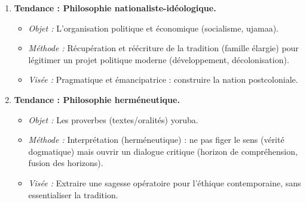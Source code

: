 \documentclass[11pt]{article}
\newcommand{\cle}[1]{{\popxbold\color{popdark}#1}}
\begin{document}
\begin{exoresolu}
\begin{enumerate}
\begin{itemize}
            \item \textit{Méthode :} Argumentation logique, distinction conceptuelle rigoureuse (pensée vs philosophie), réfutation de l'ethnophilosophie (Tempels).
            \item \textit{Visée :} Épistémologique : fonder une philosophie africaine \cle{scientifique} et \cle{universelle} selon les standards académiques.
        \end{itemize}
    \item \textbf{Tendance : Philosophie nationaliste-idéologique.}
        \begin{itemize}
            \item \textit{Objet :} L'organisation politique et économique (socialisme, ujamaa).
            \item \textit{Méthode :} Récupération et réécriture de la tradition (famille élargie) pour légitimer un projet politique moderne (développement, décolonisation).
            \item \textit{Visée :} \cle{Pragmatique} et \cle{émancipatrice} : construire la nation postcoloniale.
        \end{itemize}
    \item \textbf{Tendance : Philosophie herméneutique.}
        \begin{itemize}
            \item \textit{Objet :} Les proverbes (textes/oralités) yoruba.
            \item \textit{Méthode :} \cle{Interprétation} (herméneutique) : ne pas figer le sens (vérité dogmatique) mais ouvrir un \cle{dialogue critique} (horizon de compréhension, fusion des horizons).
            \item \textit{Visée :} Extraire une \cle{sagesse opératoire} pour l'éthique contemporaine, sans essentialiser la tradition.
        \end{itemize}
\end{enumerate}
\end{exoresolu}
\end{document}
